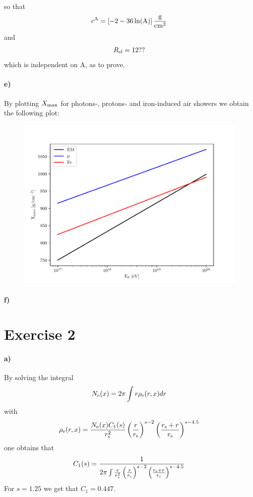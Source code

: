 \documentclass{article}
\begin{document}
so that 
\begin{align}
c^{\rm A}=\left[-2-36\ln({\rm A})\right]\frac{{\rm g}}{{\rm cm}^2}
\end{align}
and 
\begin{align}
R_{\rm el}=12??
\end{align}
which is independent on A, as to prove. 

\pagebreak
\paragraph{e)}
By plotting $X_{\rm max}$ for photons-, protons- and iron-induced air showers we obtain the following plot:
\begin{figure}[h]
\centering
\includegraphics[height=6 cm, width=8 cm]{plot_ex_1e.pdf}
\end{figure}

\paragraph{f)}

\section*{Exercise 2}
\paragraph{a)}
By solving the integral 
\begin{align}
N_{\rm e}(x)=2\pi\int r \rho_{\rm e}(r,x)dr
\end{align}
with 
\begin{align}
\rho_{\rm e}(r,x)=\frac{N_{\rm e}(x)C_1(s)}{r_{\rm s}^{2}}\left(\frac{r}{r_{\rm s}}\right)^{s-2}\left(\frac{r_{\rm s}+r}{r_{\rm s}}\right)^{s-4.5}
\end{align}
one obtains that 
\begin{align}
C_1(s)=\frac{1}{2\pi\int\frac{r}{r_{s}^{2}}\left(\frac{r}{r_{\rm s}}\right)^{s-2}\left(\frac{r_{\rm s}+r}{r_{\rm s}}\right)^{s-4.5}}
\end{align}
For $s=1.25$ we get that $C_1=0.447$.
\end{document}
